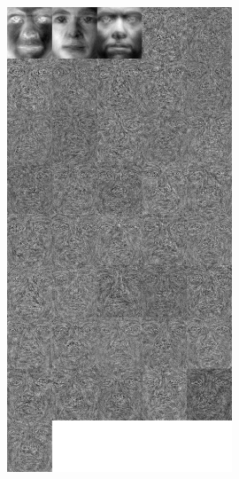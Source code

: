 \documentclass[11pt]{scrartcl} %
\theoremstyle{plain}
\begin{document}
\begin{figure}[H]
\centering
\includegraphics[width=0.6\textwidth]{figures/trial3rpca0dot001eigenfaces.jpg}
\end{figure}
\end{document}
